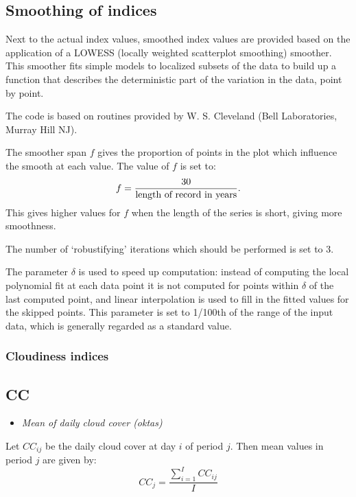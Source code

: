 \documentclass[a4paper,11pt]{article}
\begin{document}
\subsection{Smoothing of indices}
Next to the actual index values, smoothed index values are provided based on the application of a LOWESS 
(locally weighted scatterplot smoothing) smoother. This smoother fits simple models to localized subsets 
of the data to build up a function that describes the deterministic part of the variation in the data, point by point.

The code is based on routines provided by W. S. Cleveland (Bell Laboratories, Murray Hill NJ).

The smoother span $f$ gives the proportion of points in the plot which influence
the smooth at each value. The value of $f$ is set to:
\begin{equation*}
f = {30 \over \text{length of record in years}}.
\end{equation*}
This gives higher values for $f$ when the length of the series is short, giving more smoothness.

The number of `robustifying' iterations which should be performed is set to 3.

The parameter $\delta$ is used to speed up computation: instead of computing the local polynomial fit at each data
point it is not computed for points within $\delta$ of the last computed point, and linear interpolation
is used to fill in the fitted values for the skipped points.
This parameter is set to 1/100th of the range of the input data, which is generally regarded as a standard value.

\subsubsection{Cloudiness indices}

\subsection*{CC}
\begin{itemize}
\item \textit{Mean of daily cloud cover (oktas)}
\end{itemize}
Let $CC_{ij}$ be the daily cloud cover at day $i$ of period
$j$. Then mean values in period $j$ are given by:
\begin{equation*}
CC_{j} = \frac{\sum_{i=1}^{I} CC_{ij}}{I}
\end{equation*}
\end{document}
